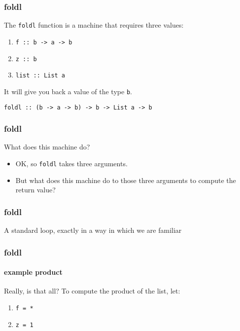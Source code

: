 \begin{frame}
\frametitle{foldl}

The \lstinline[basicstyle=\ttfamily]$foldl$ function is a machine that requires three values:
\begin{enumerate}
\item \lstinline[basicstyle=\ttfamily]$f :: b -> a -> b$
\item \lstinline[basicstyle=\ttfamily]$z :: b$
\item \lstinline[basicstyle=\ttfamily]$list :: List a$
\end{enumerate}

It will give you back a value of the type \lstinline[basicstyle=\ttfamily]$b$.

\hrulefill

\lstinline[basicstyle=\ttfamily]$foldl :: (b -> a -> b) -> b -> List a -> b$

\end{frame}


\begin{frame}
\frametitle{foldl}

\begin{block}{What does this machine do?}

\begin{itemize}
\item OK, so \lstinline[basicstyle=\ttfamily]$foldl$ takes three arguments.
\item But what does this machine do to those three arguments to compute the return value?
\end{itemize}


\end{block}

\end{frame}


\begin{frame}
\frametitle{foldl}

\begin{block}{A standard loop, exactly in a way in which we are familiar}

\end{block}

\end{frame}


\begin{frame}
\frametitle{foldl}
\framesubtitle{example \textemdash product}

\begin{block}{Really, is that all?}
To compute the product of the list, let:
\begin{enumerate}
\item \lstinline[basicstyle=\ttfamily]$f = *$
\item \lstinline[basicstyle=\ttfamily]$z = 1$
\end{enumerate}
\end{block}

\end{frame}


